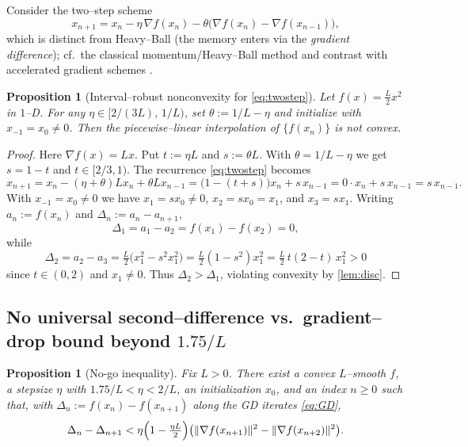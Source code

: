 \documentclass[11pt]{article}
\theoremstyle{plain}
\newtheorem{proposition}[theorem]{Proposition}
\theoremstyle{remark}
\begin{document}
Consider the two--step scheme
\begin{equation}\label{eq:twostep}
x_{n+1}=x_n-\eta\,\nabla f(x_n)-\theta\bigl(\nabla f(x_n)-\nabla f(x_{n-1})\bigr),
\end{equation}
which is distinct from Heavy--Ball (the memory enters via the \emph{gradient difference}); cf.\ the classical momentum/Heavy--Ball method \cite{Polyak1964} and contrast with accelerated gradient schemes \cite{Nesterov2013}.

\begin{proposition}[Interval--robust nonconvexity for \eqref{eq:twostep}]\label{prop:twostep}
Let $f(x)=\tfrac{L}{2}x^2$ in $1$--D. For any $\eta\in[2/(3L),\,1/L)$, set $\theta:=1/L-\eta$ and initialize with $x_{-1}=x_0\neq 0$. Then the piecewise--linear interpolation of $\{f(x_n)\}$ is not convex.
\end{proposition}

\begin{proof}
Here $\nabla f(x)=Lx$. Put $t:=\eta L$ and $s:=\theta L$. With $\theta=1/L-\eta$ we get $s=1-t$ and $t\in[2/3,1)$. The recurrence \eqref{eq:twostep} becomes
\[
x_{n+1}=x_n-(\eta+\theta)Lx_n+\theta L x_{n-1}
=\bigl(1-(t+s)\bigr)x_n+s\,x_{n-1}
=0\cdot x_n+s\,x_{n-1}
=s\,x_{n-1}.
\]
With $x_{-1}=x_0\ne0$ we have $x_1=sx_0\ne0$, $x_2=sx_0=x_1$, and $x_3=sx_1$. Writing $a_n:=f(x_n)$ and $\Delta_n:=a_n-a_{n+1}$,
\[
\Delta_1=a_1-a_2=f(x_1)-f(x_2)=0,
\]
while
\[
\Delta_2=a_2-a_3=\tfrac{L}{2}\bigl(x_1^2-s^2x_1^2\bigr)=\tfrac{L}{2}(1-s^2)x_1^2=\tfrac{L}{2}\,t(2-t)\,x_1^2>0
\]
since $t\in(0,2)$ and $x_1\ne0$. Thus $\Delta_2>\Delta_1$, violating convexity by \cref{lem:disc}.
\end{proof}

\subsection{No universal second--difference vs.\ gradient--drop bound beyond $1.75/L$}

\begin{proposition}[No-go inequality]\label{prop:nogo}
Fix $L>0$. There exist a convex $L$--smooth $f$, a stepsize $\eta$ with $1.75/L<\eta<2/L$, an initialization $x_0$, and an index $n\ge0$ such that, with $\Delta_n:=f(x_n)-f(x_{n+1})$ along the GD iterates \eqref{eq:GD},
\[
\Delta_n-\Delta_{n+1}
<\eta\Bigl(1-\tfrac{\eta L}{2}\Bigr)\bigl(\|\nabla f(x_{n+1})\|^2-\|\nabla f(x_{n+2})\|^2\bigr).
\]
\end{proposition}
\end{document}
